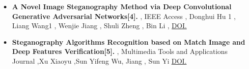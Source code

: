 \documentclass{beamer} %
\theoremstyle{definition} %
\begin{document}
\begin{itemize}
	\item{\textbf{A Novel Image Steganography Method via Deep Convolutional Generative Adversarial Networks[4]. }, IEEE Access , Donghui Hu 1 , Liang Wang1 , Wenjie Jiang , Shuli Zheng ,  Bin Li , \href{https://doi.org/10.1109/ACCESS.2018.2852771}{DOI. }}
\end{itemize}
\begin{itemize}
     \item {\textbf{Steganography Algorithms Recognition based on Match
     Image and Deep Features Verification[5]. } , Multimedia Tools and Applications Journal ,Xu Xiaoyu ,Sun Yifeng Wu, Jiang , Sun Yi \href{https://doi.org/10.1007/s11042-018-6010-9}{DOI. }}
  
\end{itemize}
\end{document}
